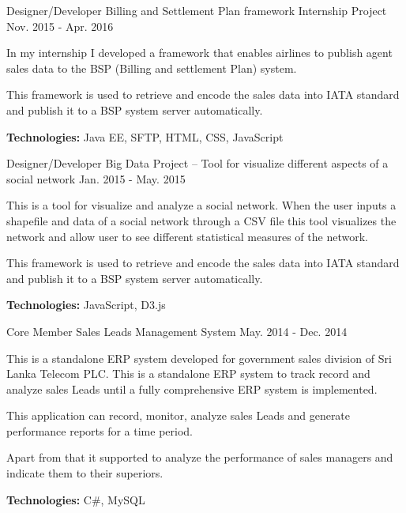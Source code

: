 \begin{cventries}
  \cventry
    {Designer/Developer} %
    {Billing and Settlement Plan framework} %
    {Internship Project} %
    {Nov. 2015 - Apr. 2016} %
    {
      \begin{cvitems} %
        \item {In my internship I developed a framework that enables airlines to publish agent sales data to the BSP (Billing and settlement Plan) system.}
        \item {This framework is used to retrieve and encode the sales data into IATA standard and publish it to a BSP system server automatically.}
        \item {\textbf{Technologies: } Java EE, SFTP, HTML, CSS, JavaScript}
      \end{cvitems}
    }

  \cventry
    {Designer/Developer} %
    {Big Data Project – Tool for visualize different aspects of a social network} %
    {} %
    {Jan. 2015 - May. 2015} %
    {
      \begin{cvitems} %
        \item {This is a tool for visualize and analyze a social network. When the user inputs a shapefile and data of a social network through a CSV file this tool visualizes the network and allow user to see different statistical measures of the network. }
        \item {This framework is used to retrieve and encode the sales data into IATA standard and publish it to a BSP system server automatically.}
        \item {\textbf{Technologies: } JavaScript, D3.js }
      \end{cvitems}
    }

  \cventry
    {Core Member} %
    {Sales Leads Management System  } %
    {} %
    {May. 2014 - Dec. 2014} %
    {
      \begin{cvitems} %
        \item {This is a standalone ERP system developed for government sales division of Sri Lanka Telecom PLC. This is a standalone ERP system to track record and analyze sales Leads until a fully comprehensive ERP system is implemented.}
        \item {This application can record, monitor, analyze sales Leads and generate performance reports for a time period.}
        \item {Apart from that it supported to analyze the performance of sales managers and indicate them to their superiors.}
        \item {\textbf{Technologies: } C\#, MySQL }
      \end{cvitems}
    }


\end{cventries}
